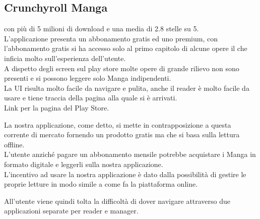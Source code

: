 \documentclass{report}
\begin{document}
\begin{enumerate}
	      \subsection{Crunchyroll Manga} con più di 5 milioni di download e una media di 2.8 stelle su 5.\\
	      L'applicazione presenta un abbonamento gratis ed uno premium, con l'abbonamento gratis si ha accesso solo al primo capitolo di alcune opere il che inficia molto sull'esperienza dell'utente.\\
	      A dispetto degli screen sul play store molte opere di grande rilievo non sono presenti e si possono leggere solo Manga indipendenti.\\
	      La UI risulta molto facile da navigare e pulita, anche il reader è molto facile da usare e tiene traccia della pagina alla quale si è arrivati.\\
	      Link per la pagina del Play Store.
\end{enumerate}

La nostra applicazione, come detto, si mette in contrapposizione a
questa corrente di mercato fornendo un prodotto gratis ma che si basa
sulla lettura offline.\\
L'utente anziché pagare un abbonamento mensile potrebbe acquistare i
Manga in formato digitale e leggerli sulla nostra applicazione.\\
L'incentivo ad usare la nostra applicazione è dato dalla possibilità di
gestire le proprie letture in modo simile a come fa la piattaforma
online.

All'utente viene quindi tolta la difficoltà di dover navigare attraverso
due applicazioni separate per reader e manager.



\end{document}
